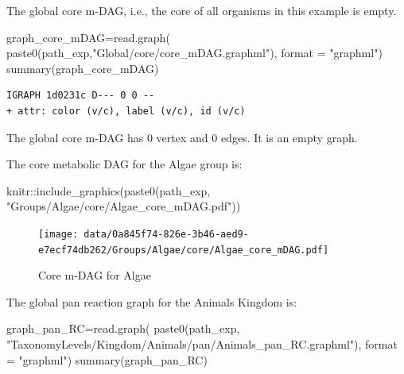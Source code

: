 \documentclass[
  letterpaper,
  DIV=11,
  numbers=noendperiod]{scrreprt}
\newenvironment{Shaded}{}{}
\newcommand{\AttributeTok}[1]{\textcolor[rgb]{0.78,0.47,0.87}{#1}}
\newcommand{\FunctionTok}[1]{\textcolor[rgb]{0.38,0.69,0.94}{#1}}
\newcommand{\NormalTok}[1]{\textcolor[rgb]{0.67,0.70,0.75}{#1}}
\newcommand{\OtherTok}[1]{\textcolor[rgb]{0.15,0.68,0.38}{#1}}
\newcommand{\SpecialCharTok}[1]{\textcolor[rgb]{0.34,0.71,0.76}{#1}}
\newcommand{\StringTok}[1]{\textcolor[rgb]{0.60,0.76,0.47}{#1}}
\begin{document}
The global core m-DAG, i.e., the core of all organisms in this example
is empty.

\begin{Shaded}
\begin{Highlighting}[]
\NormalTok{graph\_core\_mDAG}\OtherTok{=}\FunctionTok{read.graph}\NormalTok{(}
  \FunctionTok{paste0}\NormalTok{(path\_exp,}\StringTok{"Global/core/core\_mDAG.graphml"}\NormalTok{),}
  \AttributeTok{format =} \StringTok{"graphml"}\NormalTok{)}
\FunctionTok{summary}\NormalTok{(graph\_core\_mDAG)}
\end{Highlighting}
\end{Shaded}

\begin{verbatim}
IGRAPH 1d0231c D--- 0 0 -- 
+ attr: color (v/c), label (v/c), id (v/c)
\end{verbatim}

The global core m-DAG has 0 vertex and 0 edges. It is an empty graph.

The core metabolic DAG for the Algae group is:

\begin{Shaded}
\begin{Highlighting}[]
\NormalTok{knitr}\SpecialCharTok{::}\FunctionTok{include\_graphics}\NormalTok{(}\FunctionTok{paste0}\NormalTok{(path\_exp,                              }\StringTok{"Groups/Algae/core/Algae\_core\_mDAG.pdf"}\NormalTok{))}
\end{Highlighting}
\end{Shaded}

\begin{figure}[H]

{\centering \texttt{[image: data/0a845f74-826e-3b46-aed9-e7ecf74db262/Groups/Algae/core/Algae\_core\_mDAG.pdf]}

}

\caption{Core m-DAG for Algae}

\end{figure}%

The global pan reaction graph for the Animals Kingdom is:

\begin{Shaded}
\begin{Highlighting}[]
\NormalTok{graph\_pan\_RC}\OtherTok{=}\FunctionTok{read.graph}\NormalTok{(}
  \FunctionTok{paste0}\NormalTok{(path\_exp,}
         \StringTok{"TaxonomyLevels/Kingdom/Animals/pan/Animals\_pan\_RC.graphml"}\NormalTok{),}
  \AttributeTok{format =} \StringTok{"graphml"}\NormalTok{)}
\FunctionTok{summary}\NormalTok{(graph\_pan\_RC)}
\end{Highlighting}
\end{Shaded}
\end{document}
